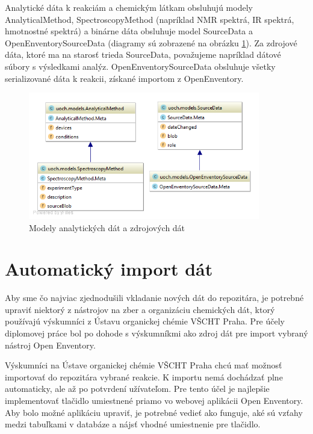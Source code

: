 \documentclass[thesis=M,slovak]{FITthesis}[2013/05/06]
\begin{document}
Analytické dáta k reakciám a chemickým látkam obsluhujú modely AnalyticalMethod, SpectroscopyMethod (napríklad NMR spektrá, IR spektrá, hmotnostné spektrá) a binárne dáta obsluhuje model SourceData a OpenEnventorySourceData (diagramy sú zobrazené na obrázku  \ref{graphics:AnalyticalMethod}). Za zdrojové dáta, ktoré ma na starosť trieda SourceData, považujeme napríklad dátové súbory s výsledkami analýz. OpenEnventorySourceData obsluhuje všetky serializované dáta k reakcii, získané importom z OpenEnventory.

\begin{figure}\centering
	\includegraphics[width=0.9\textwidth]{diagramy/UOCH_AnalyticalMethod_and_SourceData.png}
 	\caption[Modely analytických dát a zdrojových dát]{Modely analytických dát a zdrojových dát}\label{graphics:AnalyticalMethod}
\end{figure}

\section{Automatický import dát}
Aby sme čo najviac zjednodušili vkladanie nových dát do repozitára, je potrebné upraviť niektorý z nástrojov na zber a organizáciu chemických dát, ktorý používajú výskumníci z Ústavu organickej chémie VŠCHT Praha. Pre účely diplomovej práce bol po dohode s výskumníkmi ako zdroj dát pre import vybraný nástroj Open Enventory.

Výskumníci na Ústave organickej chémie VŠCHT Praha chcú mať možnosť importovať do repozitára vybrané reakcie. K importu nemá dochádzať plne automaticky, ale až po potvrdení užívateľom. Pre tento účel je najlepšie implementovať tlačidlo umiestnené priamo vo webovej aplikácii Open Enventory. Aby bolo možné aplikáciu upraviť, je potrebné vedieť ako funguje, aké sú vzťahy medzi tabuľkami v databáze a nájsť vhodné umiestnenie pre tlačidlo.
\end{document}
